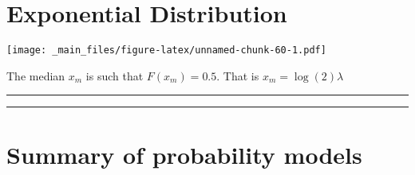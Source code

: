 \documentclass[
]{book}
\begin{document}
\hypertarget{exponential-distribution-2}{%
\section{Exponential Distribution}\label{exponential-distribution-2}}

\texttt{[image: \_main\_files/figure-latex/unnamed-chunk-60-1.pdf]}

The median \(x_m\) is such that \(F(x_m)=0.5\). That is \(x_m={\log(2)}{\lambda}\)

\begin{center}\rule{0.5\linewidth}{0.5pt}\end{center}

\begin{center}\rule{0.5\linewidth}{0.5pt}\end{center}

\hypertarget{summary-of-probability-models-1}{%
\section{Summary of probability models}\label{summary-of-probability-models-1}}
\end{document}
